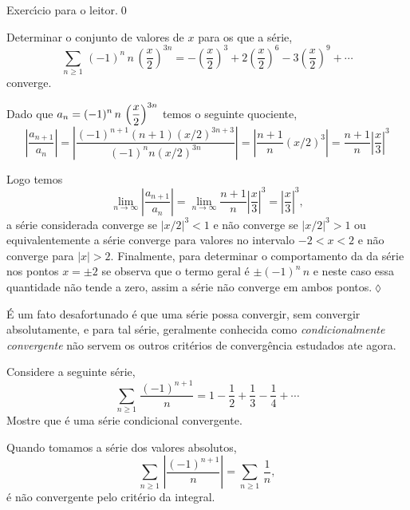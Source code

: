 \begin{prvc}{}{}
Exerc\'{\i}cio para o leitor.\qed  
\end{prvc}


\begin{exer}
Determinar o conjunto de valores de $x$ para os que a s\'{e}rie,
\begin{equation*}
\sum_{n\geq1}\,(-1)^n\, n\,
\left(\frac{x}{2}\right)^{3n}=-\left(\frac{x}{2}\right)^3+2\left(\frac{x}{2}\right)^6
-3\left(\frac{x}{2}\right)^9+\cdots
\end{equation*}
converge.
\end{exer}

\solo Dado que $a_n=\displaystyle{(-1)^n\,
n\,\left(\frac{x}{2}\right)^{3n}}$ temos o seguinte quociente,
\begin{equation*}
  \left|\frac{a_{n+1}}{a_n} \right|=\left|\frac{(-1)^{n+1}(n+1)(x/2)^{3n+3}}
  {(-1)^{n}n(x/2)^{3n}} \right|=\left|\frac{n+1}{n}(x/2)^3
  \right|=\frac{n+1}{n}\left|\frac{x}{3}\right|^3
\end{equation*}

Logo temos
\begin{equation*}
  \lim_{n\to\infty}\left|\frac{a_{n+1}}{a_n} \right|=\lim_{n\to\infty}
  \frac{n+1}{n}\left|\frac{x}{3}\right|^3=\left|\frac{x}{3}\right|^3,
\end{equation*}
a s\'{e}rie considerada converge se $|x/2|^3<1$ e n\~{a}o converge se
$|x/2|^3>1$ ou equivalentemente a s\'{e}rie converge para valores no
intervalo $-2<x<2$ e n\~{a}o converge para $|x|>2$. Finalmente, para
determinar o comportamento da da s\'{e}rie nos pontos $x=\pm 2$ se
observa que o termo geral \'{e} $\pm(-1)^n\,n$ e neste caso essa
quantidade n\~{a}o tende a zero, assim a s\'{e}rie n\~{a}o converge em ambos
pontos.\hfill \(\lozenge\)

\'{E} um fato desafortunado \'{e} que uma s\'{e}rie possa convergir, sem
convergir absolutamente, e para tal s\'{e}rie, geralmente conhecida
como \textit{condicionalmente convergente} n\~{a}o servem os outros
crit\'{e}rios de converg\^{e}ncia estudados ate agora.

\begin{exer}
Considere a seguinte s\'{e}rie,
$$
\sum_{n\geq1}\,\frac{
(-1)^{n+1}}{n}=1-\frac{1}{2}+\frac{1}{3}-\frac{1}{4}+\cdots
$$
Mostre que \'{e} uma s\'{e}rie condicional convergente.
\end{exer}

\solo Quando tomamos a s\'{e}rie dos valores absolutos,
\begin{equation*}
\sum_{n\geq1}\,\left|\frac{
(-1)^{n+1}}{n}\right|=\sum_{n\geq1}\,\frac{1}{n},
\end{equation*}
\'{e} n\~{a}o convergente pelo crit\'{e}rio da integral.

